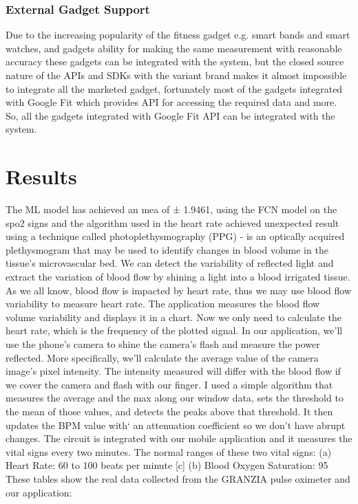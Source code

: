 \documentclass{bmcart}
\begin{document}
\subsubsection*{External Gadget Support}
Due to the increasing popularity of the fitness gadget e.g. smart bands and
smart watches, and gadgets ability for making the same measurement with
reasonable accuracy these gadgets can be integrated with the system, but the
closed source nature of the APIs and SDKs with the variant  brand makes it
almost impossible to integrate all the marketed gadget, fortunately most of the
gadgets integrated with Google Fit which provides API for accessing the required
data and more. So, all the gadgets integrated with Google Fit API can be
integrated with the system.

\section*{Results}
The ML model has achieved an mea of ± 1.9461, using the FCN model on the spo2
signs and the algorithm used in the heart rate achieved unexpected result using
a technique called photoplethysmography (PPG) - is an optically acquired
plethysmogram that may be used to identify changes in blood volume in the
tissue's microvascular bed. We can detect the variability of reflected light and
extract the variation of blood flow by shining a light into a blood irrigated
tissue. As we all know, blood flow is impacted by heart rate, thus we may use
blood flow variability to measure heart rate. The application measures the blood
flow volume variability and displays it in a chart. Now we only need to
calculate the heart rate, which is the frequency of the plotted signal. In our
application, we'll use the phone's camera to shine the camera's flash and
measure the power reflected. More specifically, we'll calculate the average
value of the camera image's pixel intensity. The intensity measured will differ
with the blood flow if we cover the camera and flash with our finger. I used a
simple algorithm that measures the average and the max along our window data,
sets the threshold to the mean of those values, and detects the peaks above that
threshold. It then updates the BPM value with` an attenuation coefficient so we
don’t have abrupt changes. The circuit is integrated with our mobile application
and it measures the vital signs every two minutes. The normal ranges of these
two vital signs: (a) Heart Rate: 60 to 100 beats per minute [c] (b) Blood Oxygen
Saturation: 95%
These tables show the real data collected from the GRANZIA pulse oximeter and
our application:
\end{document}
